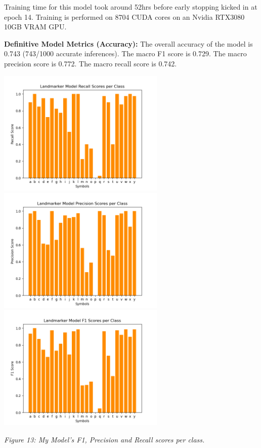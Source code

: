 \documentclass[11pt]{article}
\def\paraskip{\vskip 0.4cm}
\begin{document}
        Training time for this model took around 52hrs before early stopping kicked in at epoch 14. Training is performed on 8704 CUDA cores on an Nvidia RTX3080 10GB VRAM GPU.

        \paraskip

        \noindent\textbf{Definitive Model Metrics (Accuracy): } 
        The overall accuracy of the model is 0.743 (743/1000 accurate inferences). The macro F1 score is 0.729. The macro precision score is 0.772. The macro recall score is 0.742.

        \begin{center}
            \includegraphics[width=8cm]{images/htrecall.png}
            \includegraphics[width=8cm]{images/htprec.png}
            \\
            \includegraphics[width=8cm]{images/htf1.png}
            \\
            \raggedright \textit{
            Figure 13: My Model's F1, Precision and Recall scores per class.
            }
        \end{center}
\end{document}

